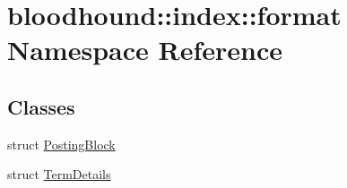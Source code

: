 \hypertarget{namespacebloodhound_1_1index_1_1format}{}\section{bloodhound\+:\+:index\+:\+:format Namespace Reference}
\label{namespacebloodhound_1_1index_1_1format}
\subsection*{Classes}
\begin{DoxyCompactItemize}
\item 
struct \mbox{\hyperlink{structbloodhound_1_1index_1_1format_1_1PostingBlock}{Posting\+Block}}
\item 
struct \mbox{\hyperlink{structbloodhound_1_1index_1_1format_1_1TermDetails}{Term\+Details}}
\end{DoxyCompactItemize}
